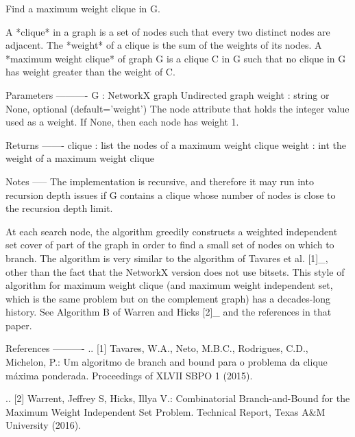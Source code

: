 \begin{DoxyVerb}Find a maximum weight clique in G.

A *clique* in a graph is a set of nodes such that every two distinct nodes
are adjacent.  The *weight* of a clique is the sum of the weights of its
nodes.  A *maximum weight clique* of graph G is a clique C in G such that
no clique in G has weight greater than the weight of C.

Parameters
----------
G : NetworkX graph
    Undirected graph
weight : string or None, optional (default='weight')
    The node attribute that holds the integer value used as a weight.
    If None, then each node has weight 1.

Returns
-------
clique : list
    the nodes of a maximum weight clique
weight : int
    the weight of a maximum weight clique

Notes
-----
The implementation is recursive, and therefore it may run into recursion
depth issues if G contains a clique whose number of nodes is close to the
recursion depth limit.

At each search node, the algorithm greedily constructs a weighted
independent set cover of part of the graph in order to find a small set of
nodes on which to branch.  The algorithm is very similar to the algorithm
of Tavares et al. [1]_, other than the fact that the NetworkX version does
not use bitsets.  This style of algorithm for maximum weight clique (and
maximum weight independent set, which is the same problem but on the
complement graph) has a decades-long history.  See Algorithm B of Warren
and Hicks [2]_ and the references in that paper.

References
----------
.. [1] Tavares, W.A., Neto, M.B.C., Rodrigues, C.D., Michelon, P.: Um
       algoritmo de branch and bound para o problema da clique máxima
       ponderada.  Proceedings of XLVII SBPO 1 (2015).

.. [2] Warrent, Jeffrey S, Hicks, Illya V.: Combinatorial Branch-and-Bound
       for the Maximum Weight Independent Set Problem.  Technical Report,
       Texas A&M University (2016).
\end{DoxyVerb}
 \mbox{\label{namespacenetworkx_1_1algorithms_1_1clique_ae7b5c17115637c1f7c9a319b1f08c6af}} 
